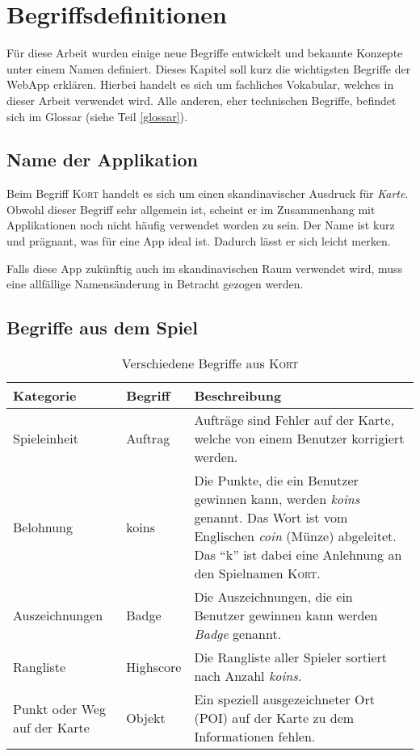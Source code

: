 \chapter{Begriffsdefinitionen}
\label{kort-definitionen}

Für diese Arbeit wurden einige neue Begriffe entwickelt und bekannte Konzepte unter einem Namen definiert.
Dieses Kapitel soll kurz die wichtigsten Begriffe der \gls{WebApp} erklären.
Hierbei handelt es sich um fachliches Vokabular, welches in dieser Arbeit verwendet wird.
Alle anderen, eher technischen Begriffe, befindet sich im Glossar (siehe Teil \ref{glossar}).

\section{Name der Applikation}
Beim Begriff \textsc{Kort} handelt es sich um einen skandinavischer Ausdruck für \emph{Karte}.
Obwohl dieser Begriff sehr allgemein ist, scheint er im Zusammenhang mit Applikationen noch nicht häufig verwendet worden zu sein.
Der Name ist kurz und prägnant, was für eine App ideal ist.
Dadurch lässt er sich leicht merken.

Falls diese App zukünftig auch im skandinavischen Raum verwendet wird, muss eine allfällige Namensänderung in Betracht gezogen werden.

\section{Begriffe aus dem Spiel}

\begin{table}[H]
\centering
\begin{tabular}{|p{0.2\threecelltabwidth}|p{0.2\threecelltabwidth}|p{0.6\threecelltabwidth}|}
\hline 
\small{\textbf{Kategorie}} & \small{\textbf{Begriff}} & \small{\textbf{Beschreibung}} \\
\hline 
Spieleinheit & Auftrag & Aufträge sind Fehler auf der Karte, welche von einem Benutzer korrigiert werden. \\
\hline 
Belohnung & koins & Die Punkte, die ein Benutzer gewinnen kann, werden \emph{koins} genannt.
Das Wort ist vom Englischen \emph{coin} (Münze) abgeleitet. 
Das "`k"' ist dabei eine Anlehnung an den Spielnamen \textsc{Kort}. \\
\hline 
Auszeichnungen & Badge & Die Auszeichnungen, die ein Benutzer gewinnen kann werden \emph{Badge} genannt. \\
\hline 
Rangliste & Highscore & Die Rangliste aller Spieler sortiert nach Anzahl \emph{koins}. \\
\hline 
Punkt oder Weg auf der Karte & Objekt & Ein speziell ausgezeichneter Ort (\gls{POI}) auf der Karte zu dem Informationen fehlen. \\
\hline 
\end{tabular}
\caption{Verschiedene Begriffe aus \textsc{Kort}}
\label{table-definitionen}
\end{table}